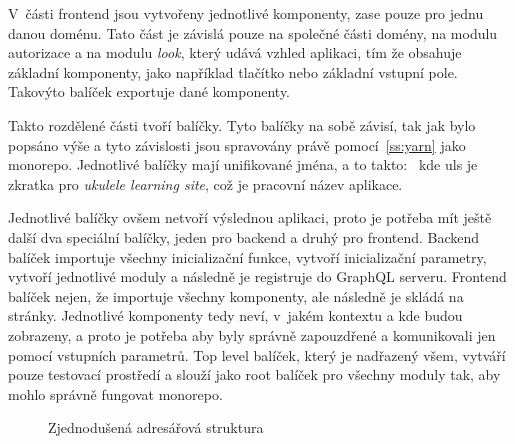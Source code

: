 V~části frontend jsou vytvořeny jednotlivé komponenty, zase pouze pro jednu danou doménu. Tato část je závislá pouze na společné části domény, na modulu autorizace a na modulu \emph{look}, který udává vzhled aplikaci, tím že obsahuje základní komponenty, jako například tlačítko nebo základní vstupní pole. Takovýto balíček exportuje dané komponenty.

Takto rozdělené části tvoří balíčky. Tyto balíčky na sobě závisí, tak jak bylo popsáno výše a tyto závislosti jsou spravovány právě pomocí~\ref{ss:yarn} jako monorepo. Jednotlivé balíčky mají unifikované jména, a to takto:~ kde uls je zkratka pro \emph{ukulele learning site}, což je pracovní název aplikace.

Jednotlivé balíčky ovšem netvoří výslednou aplikaci, proto je potřeba mít ještě další dva speciální balíčky, jeden pro backend a druhý pro frontend. Backend balíček importuje všechny inicializační funkce, vytvoří inicializační parametry, vytvoří jednotlivé moduly a následně je registruje do GraphQL serveru. Frontend balíček nejen, že importuje všechny komponenty, ale následně je skládá na stránky. Jednotlivé komponenty tedy neví, v~jakém kontextu a kde budou zobrazeny, a proto je potřeba aby byly správně zapouzdřené a komunikovali jen pomocí vstupních parametrů. Top level balíček, který je nadřazený všem, vytváří pouze testovací prostředí a slouží jako root balíček pro všechny moduly tak, aby mohlo správně fungovat monorepo.


\begin{figure}
    \caption{Zjednodušená adresářová struktura}
    \label{fig:modules}
\end{figure}

